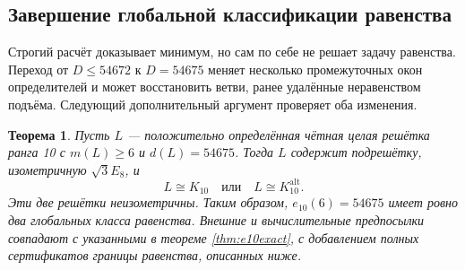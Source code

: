 \documentclass[11pt,a4paper]{article}
\newtheorem{theorem}{Теорема}[section]
\theoremstyle{remark}\newtheorem{remark}[theorem]{Замечание}
\newcommand{\Kalt}{K_{10}^{\mathrm{alt}}}
\begin{document}
\subsection{Завершение глобальной классификации равенства}\label{subsec:complete10equality}

Строгий расчёт доказывает минимум, но сам по себе не решает задачу равенства. Переход от $D\le54672$ к $D=54675$ меняет несколько промежуточных окон определителей и может восстановить ветви, ранее удалённые неравенством подъёма. Следующий дополнительный аргумент проверяет оба изменения.

\begin{theorem}\label{thm:global10equality}
Пусть $L$ --- положительно определённая чётная целая решётка ранга 10 с $m(L)\ge6$ и $d(L)=54675$. Тогда $L$ содержит подрешётку, изометричную $\sqrt3E_8$, и
\[
L\cong K_{10}\quad\text{или}\quad L\cong\Kalt.
\]
Эти две решётки неизометричны. Таким образом, $e_{10}(6)=54675$ имеет ровно два глобальных класса равенства. Внешние и вычислительные предпосылки совпадают с указанными в теореме \ref{thm:e10exact}, с добавлением полных сертификатов границы равенства, описанных ниже.
\end{theorem}
\end{document}

